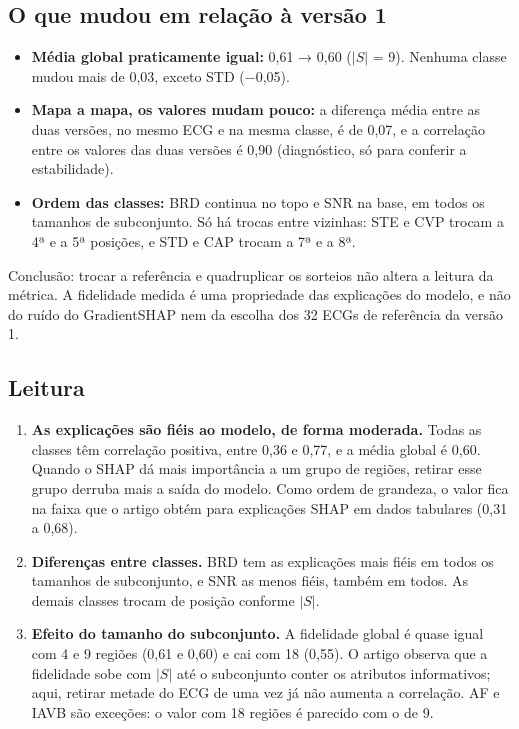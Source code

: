 \documentclass[11pt,a4paper]{article}
\begin{document}
\subsection{O que mudou em relação à versão 1}
\begin{itemize}
\item \textbf{Média global praticamente igual:} 0,61 → 0,60 ($|S|$ = 9). Nenhuma classe mudou mais de 0,03, exceto STD ($-$0,05).
\item \textbf{Mapa a mapa, os valores mudam pouco:} a diferença média entre as duas versões, no mesmo ECG e na mesma classe, é de 0,07, e a correlação entre os valores das duas versões é 0,90 (diagnóstico, só para conferir a estabilidade).
\item \textbf{Ordem das classes:} BRD continua no topo e SNR na base, em todos os tamanhos de subconjunto. Só há trocas entre vizinhas: STE e CVP trocam a 4ª e a 5ª posições, e STD e CAP trocam a 7ª e a 8ª.
\end{itemize}
Conclusão: trocar a referência e quadruplicar os sorteios não altera a leitura da métrica. A fidelidade medida é uma propriedade das explicações do modelo, e não do ruído do GradientSHAP nem da escolha dos 32 ECGs de referência da versão 1.

\subsection{Leitura}
\begin{enumerate}
\item \textbf{As explicações são fiéis ao modelo, de forma moderada.} Todas as classes têm correlação positiva, entre 0,36 e 0,77, e a média global é 0,60. Quando o SHAP dá mais importância a um grupo de regiões, retirar esse grupo derruba mais a saída do modelo. Como ordem de grandeza, o valor fica na faixa que o artigo obtém para explicações SHAP em dados tabulares (0,31 a 0,68).
\item \textbf{Diferenças entre classes.} BRD tem as explicações mais fiéis em todos os tamanhos de subconjunto, e SNR as menos fiéis, também em todos. As demais classes trocam de posição conforme $|S|$.
\item \textbf{Efeito do tamanho do subconjunto.} A fidelidade global é quase igual com 4 e 9 regiões (0,61 e 0,60) e cai com 18 (0,55). O artigo observa que a fidelidade sobe com $|S|$ até o subconjunto conter os atributos informativos; aqui, retirar metade do ECG de uma vez já não aumenta a correlação. AF e IAVB são exceções: o valor com 18 regiões é parecido com o de 9.
\end{enumerate}
\end{document}
